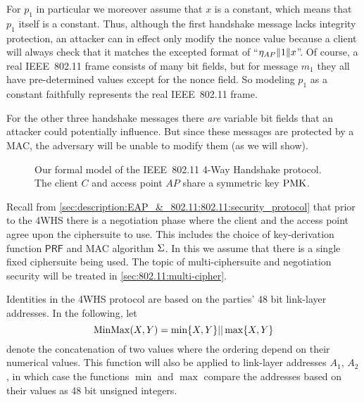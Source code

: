 For $p_1$ in particular we moreover assume that $x$ is a constant, 
which means that $p_1$ itself is a constant.
Thus, 
although the first handshake message lacks integrity protection,
an attacker can in effect only modify the nonce value because a client will always check that it matches the excepted format of ``$\eta_{AP} \| 1 \| x$''.
Of course,
a real IEEE~802.11 frame consists of many bit fields,
but for message $m_1$ they all have pre-determined values except for the nonce field.
So modeling $p_1$ as a constant faithfully represents the real IEEE~802.11 frame.
 
For the other three handshake messages there \emph{are} variable bit fields that an attacker could potentially influence.
But since these messages are protected by a MAC,
the adversary will be unable to modify them (as we will show).



\begin{figure}

	\centering

	

	\caption{Our formal model of the IEEE~802.11 4-Way Handshake protocol. 
	The client $C$ and access point $AP$ share a symmetric key $\mathrm{PMK}$.
	}
	\label{fig:4WHS}
\end{figure}


Recall from \cref{sec:description:EAP_&_802.11:802.11:security_protocol} that prior to the 4WHS there is a negotiation phase where the client and the access point agree upon the ciphersuite to use. 
This includes the choice of key-derivation function $\mathsf{PRF}$ and MAC algorithm $\Sigma$.
In this  we assume that there is a single fixed ciphersuite being used.
The topic of multi-ciphersuite and negotiation security will be treated in \cref{sec:802.11:multi-cipher}. 

Identities in the 4WHS protocol are based on the parties' 48 bit link-layer addresses.
In the following,
let
\begin{equation}
	\operatorname{MinMax}(X,Y) = \min \lbrace X, Y \rbrace || \max \lbrace X, Y \rbrace
\end{equation}
denote the concatenation of two values where the ordering depend on their  numerical values.
This function will also be applied to link-layer addresses $A_1$, $A_2$,
in which case the functions  $\min$ and $\max$ compare the addresses based on their values as 48 bit unsigned integers.


